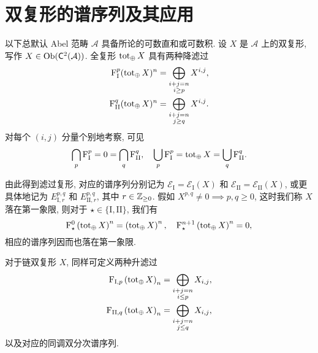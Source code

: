 \section{双复形的谱序列及其应用}\label{sec:double-cplx-ss}
以下总默认 Abel 范畴 $\mathcal{A}$ 具备所论的可数直和或可数积. 设 $X$ 是 $\mathcal{A}$ 上的双复形, 写作 $X \in \operatorname{Ob}(\mathsf{C}^2(\mathcal{A}))$. 全复形 $\operatorname{tot}_{\oplus} X$ 具有两种降滤过
\begin{align*}
	\mathrm{F}^p_{\mathrm{I}} (\operatorname{tot}_{\oplus} X)^n & = \bigoplus_{\substack{i+j=n \\ i \geq p}} X^{i, j}, \\
	\mathrm{F}^q_{\mathrm{II}} (\operatorname{tot}_{\oplus} X)^n & = \bigoplus_{\substack{i+j=n \\ j \geq q}} X^{i, j} .
\end{align*}
对每个 $(i, j)$ 分量个别地考察, 可见
\[ \bigcap_p \mathrm{F}^p_{\mathrm{I}} = 0 = \bigcap_q \mathrm{F}^q_{\mathrm{II}}, \quad \bigcup_p \mathrm{F}^p_{\mathrm{I}} = \operatorname{tot}_{\oplus} X = \bigcup_q \mathrm{F}^q_{\mathrm{II}}. \]

由此得到滤过复形, 对应的谱序列分别记为 $\mathscr{E}_{\mathrm{I}} = \mathscr{E}_{\mathrm{I}}(X)$ 和 $\mathscr{E}_{\mathrm{II}} = \mathscr{E}_{\mathrm{II}}(X)$, 或更具体地记为 $E_{\mathrm{I}, r}^{p,q}$ 和 $E_{\mathrm{II}, r}^{p,q}$, 其中 $r \in \mathbb{Z}_{\geq 0}$. 假如 $X^{p,q} \neq 0 \implies p,q \geq 0$, 这时我们称 $X$ 落在第一象限, 则对于 $\star \in \{ \mathrm{I}, \mathrm{II} \}$, 我们有
\[ \mathrm{F}_\star^0 \left(\operatorname{tot}_{\oplus} X \right)^n = \left(\operatorname{tot}_{\oplus} X\right)^n, \quad \mathrm{F}_\star^{n+1} \left(\operatorname{tot}_{\oplus} X \right)^n = 0 , \]
相应的谱序列因而也落在第一象限.

对于链双复形 $X$, 同样可定义两种升滤过
\begin{align*}
	\mathrm{F}_{\mathrm{I}, p} \left( \operatorname{tot}_{\oplus} X \right)_n & = \bigoplus_{\substack{i+j=n \\ i \leq p}} X_{i, j}, \\
	\mathrm{F}_{\mathrm{II}, q} \left( \operatorname{tot}_{\oplus} X \right)_n & = \bigoplus_{\substack{i+j=n \\ j \leq q}} X_{i, j},
\end{align*}
以及对应的同调双分次谱序列.

